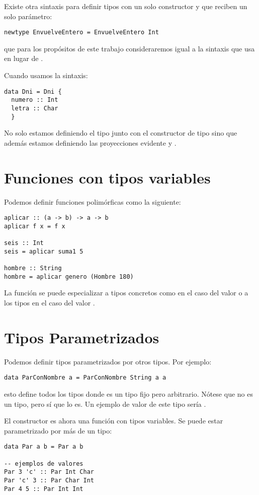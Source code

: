 Existe otra sintaxis para definir tipos con un solo constructor y que reciben
un solo parámetro:
\begin{verbatim}
newtype EnvuelveEntero = EnvuelveEntero Int
\end{verbatim}
que para los propósitos de este trabajo consideraremos igual a la sintaxis
que usa  en lugar de .

Cuando usamos la sintaxis:
\begin{verbatim}
data Dni = Dni {
  numero :: Int
  letra :: Char
  }
\end{verbatim}
No solo estamos definiendo el tipo  junto con el constructor de tipo
 sino que además estamos definiendo las
proyecciones evidente  y .

\section{Funciones con tipos variables}
Podemos definir funciones polimórficas como la siguiente:
\begin{verbatim}
aplicar :: (a -> b) -> a -> b
aplicar f x = f x

seis :: Int
seis = aplicar suma1 5

hombre :: String
hombre = aplicar genero (Hombre 180)
\end{verbatim}
La función  se puede especializar a tipos concretos como
 en el caso del valor  o a los
tipos  en el caso del
valor .


\section{Tipos Parametrizados}
Podemos definir tipos parametrizados por otros tipos. Por ejemplo:
\begin{verbatim}
data ParConNombre a = ParConNombre String a a
\end{verbatim}
esto define todos los tipos  donde  es
un tipo fijo pero arbitrario. Nótese que  no
es un tipo, pero  sí que lo es.
Un ejemplo de valor de este tipo sería .

El constructor 
es ahora una función con tipos variables. Se puede estar parametrizado por más
de un tipo:
\begin{verbatim}
data Par a b = Par a b

-- ejemplos de valores
Par 3 'c' :: Par Int Char
Par 'c' 3 :: Par Char Int
Par 4 5 :: Par Int Int
\end{verbatim}

